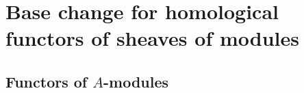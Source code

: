\section{Base change for homological functors of sheaves of modules}
\label{section:III.7}


\subsection{Functors of $A$-modules}
\label{subsection:III.7.1}
















